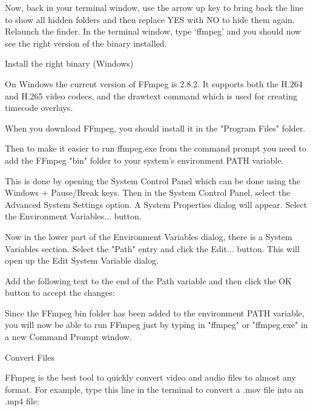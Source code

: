 \begin{fullwidth}
Now, back in your terminal window, use the arrow up key to bring back the line to show all hidden folders and then replace YES with NO to hide them again. Relaunch the finder. In the terminal window, type ‘ffmpeg’ and you should now see the right version of the binary installed.

{\large Install the right binary (Windows)\par}

On Windows the current version of FFmpeg is 2.8.2. It supports both the H.264 and H.265 video codecs, and the drawtext command which is used for creating timecode overlays.

When you download FFmpeg, you should install it in the "Program Files" folder.

Then to make it easier to run ffmpeg.exe from the command prompt you need to add the FFmpeg "bin" folder to your system's environment PATH variable.

This is done by opening the System Control Panel which can be done using the Windows + Pause/Break keys. Then in the System Control Panel, select the Advanced System Settings option. A System Properties dialog will appear. Select the Environment Variables... button.

Now in the lower part of the Environment Variables dialog, there is a System Variables section. Select the "Path" entry and click the Edit... button. This will open up the Edit System Variable dialog.


Add the following text to the end of the Path variable and then click the OK button to accept the changes:



Since the FFmpeg bin folder has been added to the environment PATH variable, you will now be able to run FFmpeg just by typing in "ffmpeg" or "ffmpeg.exe" in a new Command Prompt window.

{\large Convert Files \par}

FFmpeg is the best tool to quickly convert video and audio files to almost any format. For example, type this line in the terminal to convert a .mov file into an .mp4 file:



\end{fullwidth}
